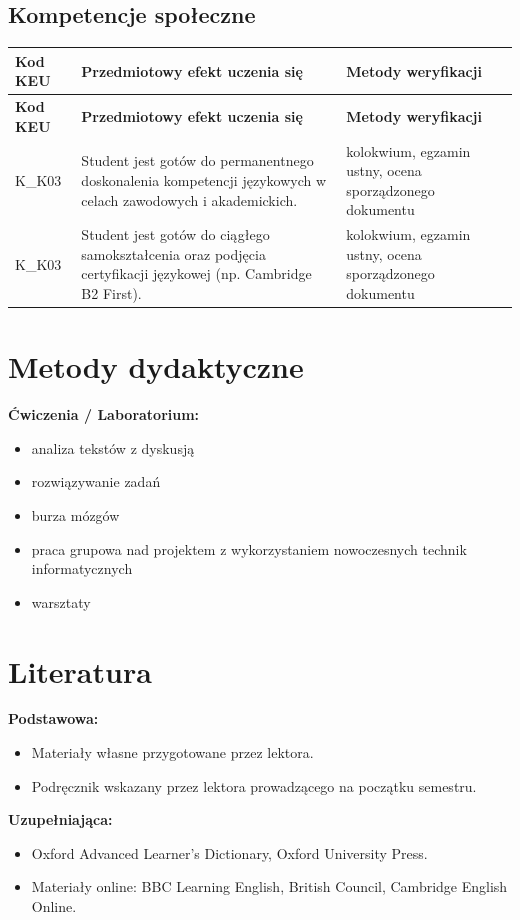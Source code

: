 \documentclass[12pt, a4paper]{article}
\newcommand{\thdrule}{\noalign{\global\setlength{\extrarowheight}{0pt}}}
\newcommand{\thdend}{\noalign{\global\setlength{\extrarowheight}{3pt}}}
\begin{document}
\subsection*{Kompetencje społeczne}
{\scriptsize
\begin{longtable}{m{1.6cm}m{9.0cm}m{4.2cm}}
\thdrule\toprule
\rowcolor{pjatkRed} {\color{white}\footnotesize\textbf{\vphantom{Ag}Kod KEU}} & {\color{white}\footnotesize\textbf{\vphantom{Ag}Przedmiotowy efekt uczenia się}} & {\color{white}\footnotesize\textbf{\vphantom{Ag}Metody weryfikacji}} \\
\midrule\thdend
\endfirsthead
\thdrule\toprule
\rowcolor{pjatkRed} {\color{white}\footnotesize\textbf{\vphantom{Ag}Kod KEU}} & {\color{white}\footnotesize\textbf{\vphantom{Ag}Przedmiotowy efekt uczenia się}} & {\color{white}\footnotesize\textbf{\vphantom{Ag}Metody weryfikacji}} \\
\midrule\thdend
\endhead
  \rowcolor{tableRowLight} K\_K03 & Student jest gotów do permanentnego doskonalenia kompetencji językowych w celach zawodowych i akademickich. & kolokwium, egzamin ustny, ocena sporządzonego dokumentu \\
  \rowcolor{tableRowAlt} K\_K03 & Student jest gotów do ciągłego samokształcenia oraz podjęcia certyfikacji językowej (np. Cambridge B2 First). & kolokwium, egzamin ustny, ocena sporządzonego dokumentu \\
\bottomrule
\end{longtable}}

\section{Metody dydaktyczne}

\textbf{Ćwiczenia / Laboratorium:}
\begin{itemize}
  \item analiza tekstów z dyskusją
  \item rozwiązywanie zadań
  \item burza mózgów
  \item praca grupowa nad projektem z wykorzystaniem nowoczesnych technik informatycznych
  \item warsztaty
\end{itemize}
\vspace{4pt}


\section{Literatura}

\textbf{Podstawowa:}
\begin{itemize}
  \item Materiały własne przygotowane przez lektora.
  \item Podręcznik wskazany przez lektora prowadzącego na początku semestru.
\end{itemize}

\textbf{Uzupełniająca:}
\begin{itemize}
  \item Oxford Advanced Learner's Dictionary, Oxford University Press.
  \item Materiały online: BBC Learning English, British Council, Cambridge English Online.
\end{itemize}
\end{document}
